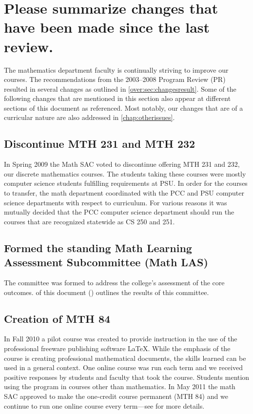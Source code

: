 
\section[Changes since the last program review]{Please summarize changes that have been made since the last
review.}
The mathematics department faculty is continually striving to improve our
courses.  The recommendations from the 2003--2008 Program Review (PR) \cite{mathprogramreview2003}
resulted in several changes as outlined in \vref{over:sec:changesresult}.  Some of the following 
changes that are mentioned in this section also appear at different sections of this document
as referenced. Most notably, our changes that are of a curricular nature are also addressed in  \vref{chap:otherissues}.

\subsection{Discontinue MTH 231 and MTH 232} In Spring 2009 
    the Math SAC voted to discontinue offering MTH
    231 and 232, our discrete mathematics courses.  The students taking these
    courses were mostly computer science students fulfilling requirements at
    PSU.  In order for the courses to transfer, the math department coordinated
    with the PCC and PSU computer science departments with respect to
    curriculum.  For various reasons it was mutually decided that the PCC
    computer science department should run the courses that are recognized
    statewide as CS 250 and 251. 
  \subsection{Formed the standing Math Learning Assessment Subcommittee
    (Math LAS)}
     The committee was formed to address the college's assessment of the core
    outcomes.   of this document () 
    outlines the results of this committee.    
  \subsection{Creation of MTH 84} In Fall 2010 a pilot course was created to provide
    instruction in the use of the professional freeware publishing software
    \LaTeX.   While the emphasis of the course is creating professional
    mathematical documents, the skills learned can be used in a general context.
    One online course was run each term and we received positive responses by
    students and faculty that took the course.  Students mention using the
    program in courses other than mathematics.   In May 2011 the math SAC
    approved to make the one-credit course permanent (MTH 84) and we continue to run one
    online course every term---see  for more details.
